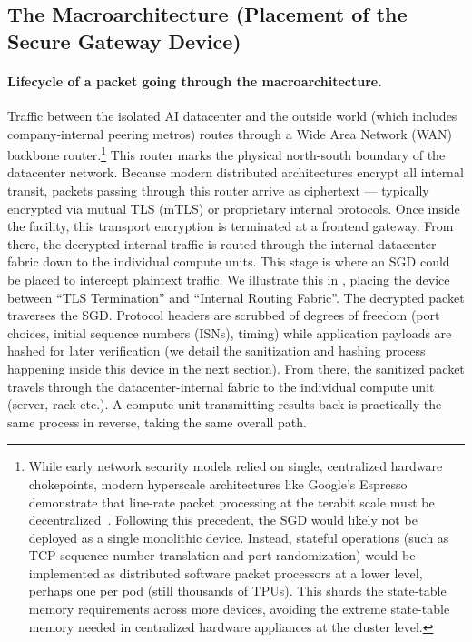 \documentclass{article}
\begin{document}
\subsection{The Macroarchitecture (Placement of the Secure Gateway Device)}

\paragraph{Lifecycle of a packet going through the macroarchitecture.}
Traffic between the isolated AI datacenter and the outside world (which includes company-internal peering metros) routes through a Wide Area Network (WAN) backbone router.\footnote{While early network security models relied on single, centralized hardware chokepoints, modern hyperscale architectures like Google's Espresso demonstrate that line-rate packet processing at the terabit scale must be decentralized~\cite{yap2017espresso}. Following this precedent, the SGD would likely not be deployed as a single monolithic device. Instead, stateful operations (such as TCP sequence number translation and port randomization) would be implemented as distributed software packet processors at a lower level, perhaps one per pod (still thousands of TPUs). This shards the state-table memory requirements across more devices, avoiding the extreme state-table memory needed in centralized hardware appliances at the cluster level.} This router marks the physical north-south boundary of the datacenter network. Because modern distributed architectures encrypt all internal transit, packets passing through this router arrive as ciphertext --- typically encrypted via mutual TLS (mTLS) or proprietary internal protocols. Once inside the facility, this transport encryption is terminated at a frontend gateway. From there, the decrypted internal traffic is routed through the internal datacenter fabric down to the individual compute units. This stage is where an SGD could be placed to intercept plaintext traffic. We illustrate this in , placing the device between ``TLS Termination'' and ``Internal Routing Fabric''. The decrypted packet traverses the SGD. Protocol headers are scrubbed of degrees of freedom (port choices, initial sequence numbers (ISNs), timing) while application payloads are hashed for later verification (we detail the sanitization and hashing process happening inside this device in the next section). From there, the sanitized packet travels through the datacenter-internal fabric to the individual compute unit (server, rack etc.). A compute unit transmitting results back is practically the same process in reverse, taking the same overall path.
\end{document}

